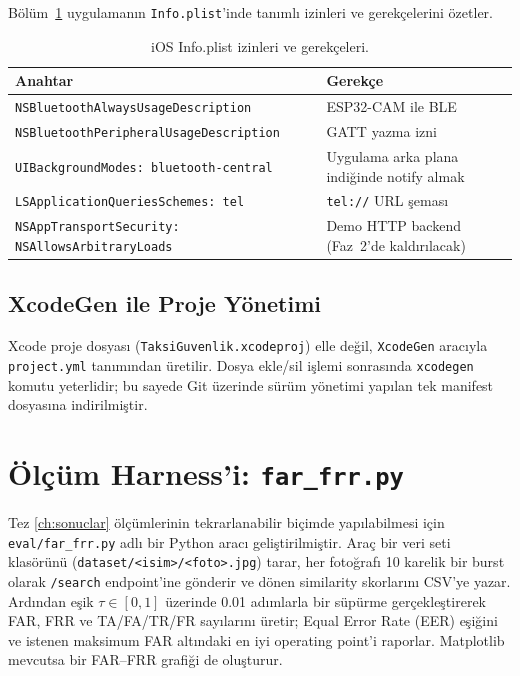 Bölüm~\ref{tab:ios-izinler} uygulamanın \texttt{Info.plist}'inde tanımlı
izinleri ve gerekçelerini özetler.

\begin{table}[h!]
\centering
\caption{iOS Info.plist izinleri ve gerekçeleri.}
\label{tab:ios-izinler}
\small
\begin{tabular}{l l}
\toprule
\textbf{Anahtar} & \textbf{Gerekçe}\\
\midrule
\texttt{NSBluetoothAlwaysUsageDescription}      & ESP32-CAM ile BLE\\
\texttt{NSBluetoothPeripheralUsageDescription}  & GATT yazma izni\\
\texttt{UIBackgroundModes: bluetooth-central}   & Uygulama arka plana indiğinde notify almak\\
\texttt{LSApplicationQueriesSchemes: tel}       & \texttt{tel://} URL şeması\\
\texttt{NSAppTransportSecurity: NSAllowsArbitraryLoads} & Demo HTTP backend (Faz~2'de kaldırılacak)\\
\bottomrule
\end{tabular}
\end{table}

\subsection{XcodeGen ile Proje Yönetimi}

Xcode proje dosyası (\texttt{TaksiGuvenlik.xcodeproj}) elle değil,
\texttt{XcodeGen} aracıyla \texttt{project.yml} tanımından üretilir.
Dosya ekle/sil işlemi sonrasında \texttt{xcodegen} komutu yeterlidir;
bu sayede Git üzerinde sürüm yönetimi yapılan tek manifest dosyasına
indirilmiştir.

\section{Ölçüm Harness'i: \texttt{far\_frr.py}}
\label{sec:harness}

Tez \ref{ch:sonuclar} ölçümlerinin tekrarlanabilir biçimde
yapılabilmesi için \texttt{eval/far\_frr.py} adlı bir Python aracı
geliştirilmiştir. Araç bir veri seti klasörünü (\texttt{dataset/<isim>/<foto>.jpg})
tarar, her fotoğrafı 10 karelik bir burst olarak \texttt{/search}
endpoint'ine gönderir ve dönen similarity skorlarını CSV'ye yazar.
Ardından eşik $\tau \in [0, 1]$ üzerinde 0.01 adımlarla bir süpürme
gerçekleştirerek FAR, FRR ve TA/FA/TR/FR sayılarını üretir; Equal Error
Rate (EER) eşiğini ve istenen maksimum FAR altındaki en iyi operating
point'i raporlar. Matplotlib mevcutsa bir FAR--FRR grafiği de
oluşturur.

